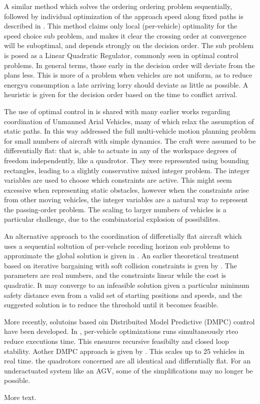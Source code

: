 \documentclass[11pt]{article} %
\begin{document}
A similar method which solves the ordering ordering problem sequentially, followed by individual optimization of the approach speed along fixed paths is described in \cite{DeCampos2017}. This method claims only local (per-vehicle) optimality for the speed choice sub problem, and makes it clear the crossing order at convergence will be suboptimal, and depends strongly on the decision order. The sub problem is posed as a Linear Quadratic Regulator, commonly seen in optimal control problems. In general terms, those early in the decision order will deviate from the plans less. This is more of a problem when vehicles are not uniform, as to reduce energyu consumption a late arriving lorry should deviate as little as possible. A heuristic is given for the decision order based on the time to conflict arrival.

The use of optimal control in \cite{DeCampos2017} is shared with many earlier works regarding coordination of Unmanned Arial Vehicles, many of which relax the assumption of static paths. In this way \cite{Schouwenaars2004} addressed the full multi-vehicle motion planning problem for small numbers of aircraft with simple dynamics. The craft were assumed to be differentially flat: that is, able to actuate in any of the workspace degrees of freedom independently, like a quadrotor. They were represented using bounding rectangles, leading to a slightly conservative mixed integer problem. The integer variables are used to choose which constraints are active. This might seem excessive when representing static obstacles, however when the constraints arise from other moving vehicles, the integer variables are a natural way to represent the passing-order problem. The scaling to larger numbers of vehicles is a particular challenge, due to the combinatorial explosion of possibilites.

An alternative approach to the coordination of differetially flat aircraft which uses a sequential soltution of per-vehcle receding horizon sub problems to approximate the global solution is given in \cite{Keviczky2008}. An earlier theoretical treatment based on iterative bargaining with soft collision constraints is gven by \cite{Inalhan2002}. The parameters are real numbers, and the constraints linear while the cost is quadratic. It may converge to an infeasible solution given a particular minimum safety distance even from a valid set of starting positions and speeds, and the suggested solution is to reduce the threshold until it becomes feasible.  

More recently, solutoins based oin Distribuited Model Predictive (DMPC) control have been developed. In \cite{Dai2016}, per-vehicle optimizations runs simultaneously rteo reduce executions time. This ensuures recursive feasibilty and closed loop stability. Aother DMPC approach is given by \cite{Lui2019}. This scales up to 25 vehicles in real time. the quadrotors concerned are all identical and differntially flat. For an underactuated system like an AGV, some of the simplifications may no longer be possible. 

 

More text.


\end{document}
